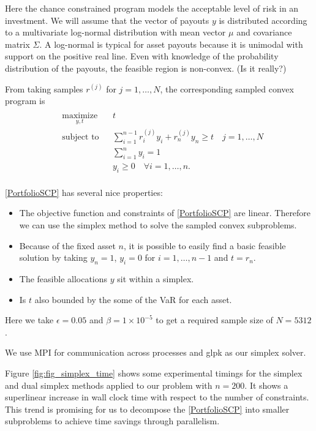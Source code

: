 \documentclass[12pt]{article}
\begin{document}
Here the chance constrained program models the acceptable level of risk in an investment.
We will assume that the vector of payouts $y$ is distributed according to a multivariate log-normal distribution with mean vector $\mu$ and covariance matrix $\Sigma$.
A log-normal is typical for asset payouts because it is unimodal with support on the positive real line.
Even with knowledge of the probability distribution of the payouts, the feasible region is non-convex. (Is it really?)


From taking samples $r^{(j)}$ for $j = 1, \ldots, N$, the corresponding sampled convex program is 
\begin{align}\label{PortfolioSCP}
\begin{split}
\begin{aligned}
    & \underset{y, t}{\text{maximize}}
    & & t \\
    & \text{subject to}
    & & \sum_{i=1}^{n-1} r_i^{(j)} y_i + r_n^{(j)} y_n \geq t \quad j = 1, \ldots, N \\
    & & & \sum_{i=1}^n y_i = 1 \\
    & & & y_i \geq 0 \quad \forall i = 1, \ldots, n.
\end{aligned}
\end{split} \tag{Portfolio SCP$_N$}
\end{align}


\ref{PortfolioSCP} has several nice properties:
\begin{itemize}
\item The objective function and constraints of \ref{PortfolioSCP} are linear. Therefore we can use the simplex method to solve the sampled convex subproblems.
\item Because of the fixed asset $n$, it is possible to easily find a basic feasible solution by taking $y_n = 1$, $y_i = 0$ for $i = 1, \ldots, n-1$ and $t = r_n$.
\item The feasible allocations $y$ sit within a simplex.
\item Is $t$ also bounded by the some of the VaR for each asset.
\end{itemize}

Here we take $\epsilon = 0.05$ and $\beta = 1 \times 10^{-5}$ to get a required sample size of $N = 5312$.

We use MPI for communication across processes and glpk as our simplex solver.

Figure \ref{fig:fig_simplex_time} shows some experimental timings for the simplex and dual simplex methods applied to our problem with $n = 200$.
It shows a superlinear increase in wall clock time with respect to the number of constraints.
This trend is promising for us to decompose the \ref{PortfolioSCP} into smaller subproblems to achieve time savings through parallelism.
\end{document}
